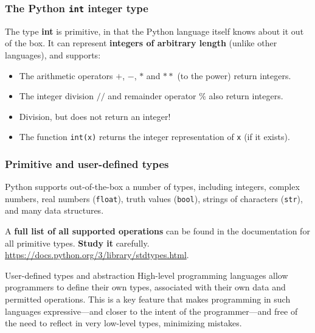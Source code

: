 \documentclass{beamer} %
\newcommand\emc[1]{\textcolor{brightblue}{\textbf{#1}}}
\begin{document}
\begin{frame}
\frametitle{The Python \texttt{int} integer type} 

The type \emc{int} is primitive, in that the Python language itself knows about it out of the box. It can represent \emc{integers of arbitrary length} (unlike other languages), and supports:
\begin{itemize}
\item The arithmetic operators $+$, $-$, $*$ and $**$ (to the power) return integers.
\item The integer division $//$ and remainder operator $\%$ also return integers.
\item Division, but does not return an integer!
\item The function \texttt{int(x)} returns the integer representation of \texttt{x} (if it exists).
\end{itemize}

\end{frame}

\begin{frame}
\frametitle{Primitive and user-defined types} 

Python supports out-of-the-box a number of types, including integers, complex numbers, real numbers (\texttt{float}), truth values (\texttt{bool}), strings of characters (\texttt{str}), and many data structures.

\vspace{5mm}
A \emc{full list of all supported operations} can be found in the documentation for all primitive types. \emc{Study it} carefully. \url{https://docs.python.org/3/library/stdtypes.html}.


\begin{block}{User-defined types and abstraction}
High-level programming languages allow programmers to define their own types, associated with their own data and permitted operations. This is a key feature that makes programming in such languages expressive---and closer to the intent of the programmer---and free of the need to reflect in very low-level types, minimizing mistakes.
\end{block}

\end{frame}
\end{document}
